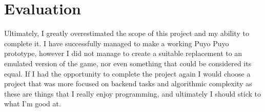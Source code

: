 \documentclass{report}
\begin{document}
\chapter{Evaluation}

Ultimately, I greatly overestimated the scope of this project and my ability to complete it. I have successfully managed to make a working Puyo Puyo prototype, however I did not manage to create a suitable replacement to an emulated version of the game, nor even something that could be considered its equal. If I had the opportunity to complete the project again I would choose a project that was more focused on backend tasks and algorithmic complexity as these are things that I really enjoy programming, and ultimately I should stick to what I'm good at.
\end{document}
